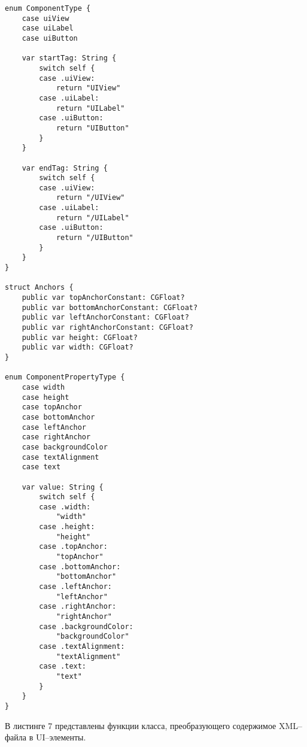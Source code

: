 \begin{lstlisting}[caption={Перечисления и структуры, определяющие список базовых UI--элементов, их свойства и атрибуты}]
enum ComponentType {
    case uiView
    case uiLabel
    case uiButton

    var startTag: String {
        switch self {
        case .uiView:
            return "UIView"
        case .uiLabel:
            return "UILabel"
        case .uiButton:
            return "UIButton"
        }
    }

    var endTag: String {
        switch self {
        case .uiView:
            return "/UIView"
        case .uiLabel:
            return "/UILabel"
        case .uiButton:
            return "/UIButton"
        }
    }
}

struct Anchors {
    public var topAnchorConstant: CGFloat?
    public var bottomAnchorConstant: CGFloat?
    public var leftAnchorConstant: CGFloat?
    public var rightAnchorConstant: CGFloat?
    public var height: CGFloat?
    public var width: CGFloat?
}

enum ComponentPropertyType {
    case width
    case height
    case topAnchor
    case bottomAnchor
    case leftAnchor
    case rightAnchor
    case backgroundColor
    case textAlignment
    case text

    var value: String {
        switch self {
        case .width:
            "width"
        case .height:
            "height"
        case .topAnchor:
            "topAnchor"
        case .bottomAnchor:
            "bottomAnchor"
        case .leftAnchor:
            "leftAnchor"
        case .rightAnchor:
            "rightAnchor"
        case .backgroundColor:
            "backgroundColor"
        case .textAlignment:
            "textAlignment"
        case .text:
            "text"
        }
    }
}
\end{lstlisting}

В листинге 7 представлены функции класса, преобразующего содержимое XML--файла в UI--элементы.

